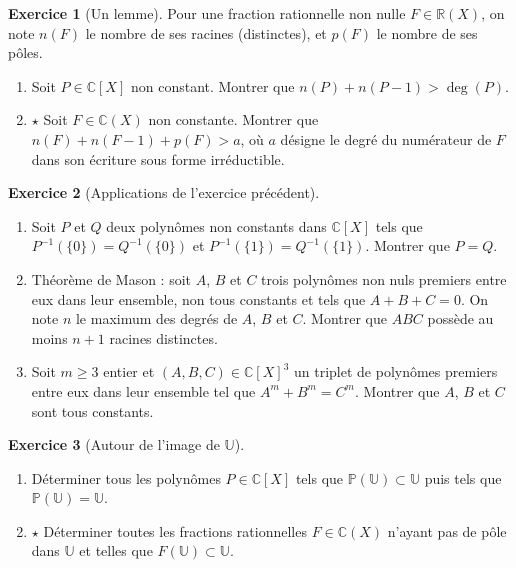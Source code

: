 \documentclass[french]{book}
\renewcommand{\P}{\mathbb{P}}
\newcommand{\R}{\mathbb{R}}
\newcommand{\C}{\mathbb{C}}
\newcommand{\U}{\mathbb{U}}
\newcommand{\inv}{^{-1}}
\theoremstyle{definition}
\newtheorem{ex}{Exercice}[chapter]
\theoremstyle{theorem}
\theoremstyle{remark}
\begin{document}
\begin{ex}[Un lemme]
	Pour une fraction rationnelle non nulle $F\in\R(X)$, on note $n(F)$ le nombre de ses racines (distinctes), et $p(F)$ le nombre de ses pôles.
	\begin{enumerate}
		\item Soit $P\in\C[X]$ non constant. Montrer que $n(P)+n(P-1)>\deg(P)$.
		\item $\star$ Soit $F\in\C(X)$ non constante. Montrer que $n(F)+n(F-1)+p(F)>a$, où $a$ désigne le degré du numérateur de $F$ dans son écriture sous forme irréductible.
	\end{enumerate}
\end{ex}

\begin{ex}[Applications de l'exercice précédent]
	\begin{enumerate}
		\item Soit $P$ et $Q$ deux polynômes non constants dans $\C[X]$ tels que $P\inv(\{0\})=Q\inv(\{0\})$ et $P\inv(\{1\})=Q\inv(\{1\})$. Montrer que $P=Q$.
		\item Théorème de Mason : soit $A$, $B$ et $C$ trois polynômes non nuls premiers entre eux dans leur ensemble, non tous constants et tels que $A+B+C=0$. On note $n$ le maximum des degrés de $A$, $B$ et $C$. Montrer que $ABC$ possède au moins $n+1$ racines distinctes.
		\item Soit $m\geqslant 3$ entier et $(A,B,C)\in\C[X]^3$ un triplet de polynômes premiers entre eux dans leur ensemble tel que $A^m+B^m=C^m$. Montrer que $A$, $B$ et $C$ sont tous constants.
	\end{enumerate}
\end{ex}

\begin{ex}[Autour de l'image de $\U$]
	\begin{enumerate}
		\item Déterminer tous les polynômes $P\in\C[X]$ tels que $\P(\U)\subset\U$ puis tels que $\P(\U)=\U$.
		\item $\star$ Déterminer toutes les fractions rationnelles $F\in\C(X)$ n'ayant pas de pôle dans $\U$ et telles que $F(\U)\subset\U$.
	\end{enumerate}
\end{ex}
\end{document}

